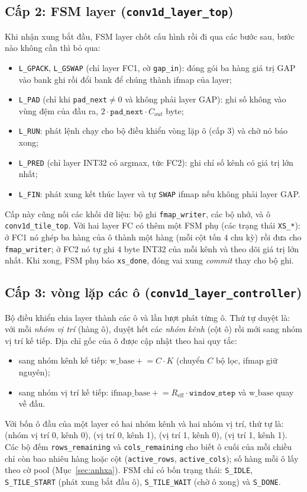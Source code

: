 \subsection{Cấp 2: FSM layer (\texttt{conv1d\_layer\_top})}
Khi nhận xung bắt đầu, FSM layer chốt cấu hình rồi đi qua các bước sau, bước nào không cần thì bỏ qua:
\begin{itemize}
  \item \texttt{L\_GPACK}, \texttt{L\_GSWAP} (chỉ layer FC1, cờ \texttt{gap\_in}): đóng gói ba hàng giá trị GAP vào bank ghi rồi đổi bank để chúng thành ifmap của layer;
  \item \texttt{L\_PAD} (chỉ khi \texttt{pad\_next}$\neq0$ và không phải layer GAP): ghi số không vào vùng đệm của đầu ra, $2\cdot\texttt{pad\_next}\cdot C_{out}$ byte;
  \item \texttt{L\_RUN}: phát lệnh chạy cho bộ điều khiển vòng lặp ô (cấp 3) và chờ nó báo xong;
  \item \texttt{L\_PRED} (chỉ layer INT32 có argmax, tức FC2): ghi chỉ số kênh có giá trị lớn nhất;
  \item \texttt{L\_FIN}: phát xung kết thúc layer và tự \texttt{SWAP} ifmap nếu không phải layer GAP.
\end{itemize}
Cấp này cũng nối các khối dữ liệu: bộ ghi \texttt{fmap\_writer}, các bộ nhớ, và ô \texttt{conv1d\_tile\_top}.
Với hai layer FC có thêm một FSM phụ (các trạng thái \texttt{XS\_*}): ở FC1 nó ghép ba hàng của ô thành một hàng (mỗi cột tốn $4$ chu kỳ) rồi đưa cho \texttt{fmap\_writer}; ở FC2 nó tự ghi $4$ byte INT32 của mỗi kênh và theo dõi giá trị lớn nhất.
Khi xong, FSM phụ báo \texttt{xs\_done}, đóng vai xung \emph{commit} thay cho bộ ghi.

\subsection{Cấp 3: vòng lặp các ô (\texttt{conv1d\_layer\_controller})}
Bộ điều khiển chia layer thành các ô và lần lượt phát từng ô.
Thứ tự duyệt là: với mỗi \emph{nhóm vị trí} (hàng ô), duyệt hết các \emph{nhóm kênh} (cột ô) rồi mới sang nhóm vị trí kế tiếp.
Địa chỉ gốc của ô được cập nhật theo hai quy tắc:
\begin{itemize}
  \item sang nhóm kênh kế tiếp: $\mathrm{w\_base}\mathrel{+}=C\cdot K$ (chuyển $C$ bộ lọc, ifmap giữ nguyên);
  \item sang nhóm vị trí kế tiếp: $\mathrm{ifmap\_base}\mathrel{+}=R_{\text{eff}}\cdot\texttt{window\_step}$ và $\mathrm{w\_base}$ quay về đầu.
\end{itemize}
Với bốn ô đầu của một layer có hai nhóm kênh và hai nhóm vị trí, thứ tự là: (nhóm vị trí 0, kênh 0), (vị trí 0, kênh 1), (vị trí 1, kênh 0), (vị trí 1, kênh 1).
Các bộ đếm \texttt{rows\_remaining} và \texttt{cols\_remaining} cho biết ô cuối của mỗi chiều chỉ còn bao nhiêu hàng hoặc cột (\texttt{active\_rows}, \texttt{active\_cols}); số hàng mỗi ô lấy theo cờ pool (Mục~\ref{sec:anhxa}).
FSM chỉ có bốn trạng thái: \texttt{S\_IDLE}, \texttt{S\_TILE\_START} (phát xung bắt đầu ô), \texttt{S\_TILE\_WAIT} (chờ ô xong) và \texttt{S\_DONE}.

